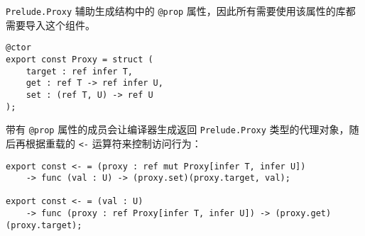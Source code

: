 \lstinline!Prelude.Proxy! 辅助生成结构中的 \lstinline!@prop! 属性，因此所有需要使用该属性的库都需要导入这个组件。

\begin{lstlisting}
@ctor
export const Proxy = struct (
    target : ref infer T,
    get : ref T -> ref infer U,
    set : (ref T, U) -> ref U
);
\end{lstlisting}

带有 \lstinline!@prop! 属性的成员会让编译器生成返回 \lstinline!Prelude.Proxy! 类型的代理对象，随后再根据重载的 \lstinline!<-! 运算符来控制访问行为：

\begin{lstlisting}
export const <- = (proxy : ref mut Proxy[infer T, infer U]) 
    -> func (val : U) -> (proxy.set)(proxy.target, val);

export const <- = (val : U) 
    -> func (proxy : ref Proxy[infer T, infer U]) -> (proxy.get)(proxy.target);
\end{lstlisting}